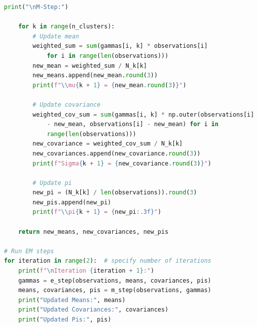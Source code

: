 \documentclass[12pt]{article}
\begin{document}
\begin{lstlisting}[language=Python, caption=Python code for Exercise 1]
    print("\nM-Step:")
    
    for k in range(n_clusters):
        # Update mean
        weighted_sum = sum(gammas[i, k] * observations[i] 
            for i in range(len(observations)))
        new_mean = weighted_sum / N_k[k]
        new_means.append(new_mean.round(3))
        print(f"\\mu{k + 1} = {new_mean.round(3)}")

        # Update covariance
        weighted_cov_sum = sum(gammas[i, k] * np.outer(observations[i] 
            - new_mean, observations[i] - new_mean) for i in 
            range(len(observations)))
        new_covariance = weighted_cov_sum / N_k[k]
        new_covariances.append(new_covariance.round(3))
        print(f"Sigma{k + 1} = {new_covariance.round(3)}")

        # Update pi
        new_pi = (N_k[k] / len(observations)).round(3)
        new_pis.append(new_pi)
        print(f"\\pi{k + 1} = {new_pi:.3f}")

    return new_means, new_covariances, new_pis

# Run EM steps
for iteration in range(2):  # specify number of iterations
    print(f"\nIteration {iteration + 1}:")
    gammas = e_step(observations, means, covariances, pis)
    means, covariances, pis = m_step(observations, gammas)
    print("Updated Means:", means)
    print("Updated Covariances:", covariances)
    print("Updated Pis:", pis)
\end{lstlisting}
\newpage
\end{document}
